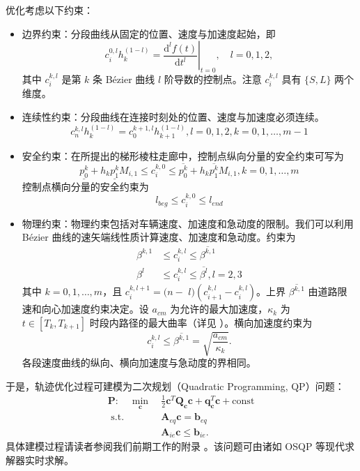 \documentclass[UTF8,a4paper,12pt,fontset=none]{ctexart}
\theoremstyle{definition}
\theoremstyle{plain}
\theoremstyle{plain}
\theoremstyle{plain}
\begin{document}
优化考虑以下约束：
\begin{itemize}
    \item 边界约束：分段曲线从固定的位置、速度与加速度起始，即
    $$
    c_{i}^{0, l} h_{k}^{(1-l)}=\left.\frac{\mathrm{d}^{l} f(t)}{\mathrm{d} t^{l}}\right|_{t=0}, \quad l=0,1,2,
    $$
    其中 $c_{i}^{k, l}$ 是第 $k$ 条 B\'{e}zier 曲线 $l$ 阶导数的控制点。注意 $c_{i}^{k, l}$ 具有 $\{S,L\}$ 两个维度。
    \item 连续性约束：分段曲线在连接时刻处的位置、速度与加速度必须连续。
    $$
    c_{n}^{k, l} h_{k}^{(1-l)}=c_{0}^{k+1, l} h_{k+1}^{(1-l)}, l=0,1,2, k=0,1, \ldots, m-1
    $$
    \item 安全约束：在所提出的梯形棱柱走廊中，控制点纵向分量的安全约束可写为
    $$
    \underline{p_{0}^{k}}+h_{k} \underline{p_{1}^{k}} M_{i, 1} \leq c_{i}^{k, 0} \leq \overline{p_{0}^{k}}+h_{k} \overline{p_{1}^{k}} M_{i, 1}, k=0,1, \ldots, m
    $$
    控制点横向分量的安全约束为
    $$
    l_{beg} \leq c_{i}^{k, 0} \leq l_{end}
    $$
    \item 物理约束：物理约束包括对车辆速度、加速度和急动度的限制。我们可以利用 B\'{e}zier 曲线的速矢端线性质计算速度、加速度和急动度。约束为
    $$
    \begin{aligned}
    \beta^{k, 1} & \leq c_{i}^{k, l} \leq \overline{\beta^{k, 1}} \\
    \beta^{l} & \leq c_{i}^{k, l} \leq \overline{\beta^{l}}, l=2,3
    \end{aligned}
    $$
    其中 $k=0,1, \ldots, m$，且 $c_{i}^{k, l+1}=(n-$ $l)\left(c_{i+1}^{k, l}-c_{i}^{k, l}\right)$。上界 $\overline{\beta^{k, 1}}$ 由道路限速和向心加速度约束决定。设 $a_{c m}$ 为允许的最大加速度，$\kappa_{k}$ 为 $t \in\left[T_{k}, T_{k+1}\right]$ 时段内路径的最大曲率（详见 \cite{8916917}）。横向加速度约束为
    $$
    c_{i}^{k, l} \leq \overline{\beta^{k, 1}}=\sqrt{\frac{a_{c m}}{\kappa_{k}}} .
    $$
各段速度曲线的纵向、横向加速度与急动度的界相同。
\end{itemize}
于是，轨迹优化过程可建模为二次规划（Quadratic Programming, QP）问题：
    $$
    \begin{aligned}
    \mathbf{P}:  \quad \min _{\mathbf{c}} \ & \frac{1}{2} \mathbf{c}^{T} \mathbf{Q}_{\mathbf{c}} \mathbf{c}+\mathbf{q}_{\mathbf{c}}^{T} \mathbf{c}+\mathrm{const} \\
    \text { s.t. } & \mathbf{A}_{e q} \mathbf{c}=\mathbf{b}_{e q} \\
    & \mathbf{A}_{i e} \mathbf{c} \leq \mathbf{b}_{i e} .
    \end{aligned}
    $$
具体建模过程请读者参阅我们前期工作的附录 \cite{extended}。该问题可由诸如 OSQP\cite{osqp} 等现代求解器实时求解。
\end{document}
